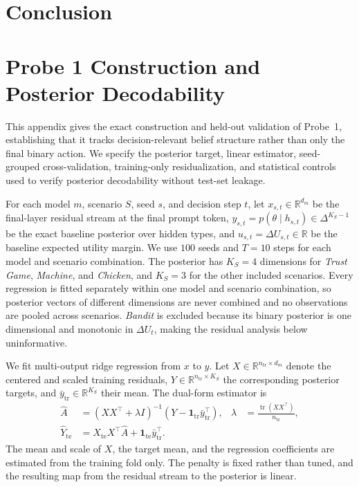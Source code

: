 \documentclass[letterpaper]{article} %
\newif\ifdraft
\newcommand{\drafttext}[1]{%
    \ifdraft
        {\color{red}#1}%
    \fi
}
\begin{document}
\section{Conclusion}
\label{sec:conclusion}

\drafttext{Summarize the behavioral results, Bayesian belief updating,
failure localization, and the difference between Bayesian and game
theoretic failures.}






\appendix

\section{Probe 1 Construction and Posterior Decodability}
\label{app:posterior}

This appendix gives the exact construction and held-out validation of Probe~1, establishing that it tracks decision-relevant belief structure rather than only the final binary action. We specify the posterior target, linear estimator, seed-grouped cross-validation, training-only residualization, and statistical controls used to verify posterior decodability without test-set leakage.

For each model \(m\), scenario \(S\), seed \(s\), and decision step \(t\), let \(x_{s,t}\in\mathbb{R}^{d_m}\) be the final-layer residual stream at the final prompt token, \(y_{s,t}=p(\theta\mid h_{s,t})\in\Delta^{K_S-1}\) be the exact baseline posterior over hidden types, and \(u_{s,t}=\Delta U_{s,t}\in\mathbb{R}\) be the baseline expected utility margin. We use \(100\) seeds and \(T=10\) steps for each model and scenario combination. The posterior has \(K_S=4\) dimensions for \textit{Trust Game}, \textit{Machine}, and \textit{Chicken}, and \(K_S=3\) for the other included scenarios. Every regression is fitted separately within one model and scenario combination, so posterior vectors of different dimensions are never combined and no observations are pooled across scenarios. \textit{Bandit} is excluded because its binary posterior is one dimensional and monotonic in \(\Delta U_t\), making the residual analysis below uninformative.

We fit multi-output ridge regression from \(x\) to \(y\). Let \(X\in\mathbb{R}^{n_{\mathrm{tr}}\times d_m}\) denote the centered and scaled training residuals, \(Y\in\mathbb{R}^{n_{\mathrm{tr}}\times K_S}\) the corresponding posterior targets, and \(\bar y_{\mathrm{tr}}\in\mathbb{R}^{K_S}\) their mean. The dual-form estimator is
\[
\begin{aligned}
\widehat A
&=(XX^\top+\lambda I)^{-1}
  \left(Y-\mathbf{1}_{\mathrm{tr}}\bar y_{\mathrm{tr}}^\top\right),
&\lambda
&=\frac{\operatorname{tr}(XX^\top)}{n_{\mathrm{tr}}},\\
\widehat Y_{\mathrm{te}}
&=X_{\mathrm{te}}X^\top\widehat A
  +\mathbf{1}_{\mathrm{te}}\bar y_{\mathrm{tr}}^\top.
\end{aligned}
\]
The mean and scale of \(X\), the target mean, and the regression coefficients are estimated from the training fold only. The penalty is fixed rather than tuned, and the resulting map from the residual stream to the posterior is linear.
\end{document}
